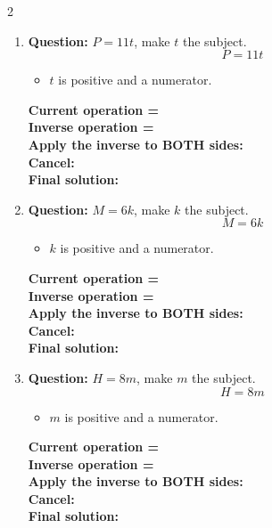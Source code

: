 \documentclass[11pt]{article}
\begin{document}
\begin{multicols}{2}
\begin{enumerate}[leftmargin=*, itemsep=10pt]
\newpage
\item \textbf{Question:} \( P = 11t \), make \( t \) the subject.
\[
P=11t
\]
\begin{itemize}[leftmargin=*, itemsep=2pt]
\item \(t\) is positive and a numerator.
\end{itemize}
\textbf{Current operation =} \\[1cm]
\textbf{Inverse operation =} \\[1cm]
\textbf{Apply the inverse to BOTH sides:} \\[1.5cm]
\textbf{Cancel:} \\[1.5cm]
\textbf{Final solution:}\\[1.5cm]

\item \textbf{Question:} \( M = 6k \), make \( k \) the subject.
\[
M=6k
\]
\begin{itemize}[leftmargin=*, itemsep=2pt]
\item \(k\) is positive and a numerator.
\end{itemize}
\textbf{Current operation =} \\[1cm]
\textbf{Inverse operation =} \\[1cm]
\textbf{Apply the inverse to BOTH sides:} \\[1.5cm]
\textbf{Cancel:} \\[1.5cm]
\textbf{Final solution:}\\[1.5cm]

\columnbreak
\item \textbf{Question:} \( H = 8m \), make \( m \) the subject.
\[
H=8m
\]
\begin{itemize}[leftmargin=*, itemsep=2pt]
\item \(m\) is positive and a numerator.
\end{itemize}
\textbf{Current operation =} \\[1cm]
\textbf{Inverse operation =} \\[1cm]
\textbf{Apply the inverse to BOTH sides:} \\[1.5cm]
\textbf{Cancel:} \\[1.5cm]
\textbf{Final solution:}\\[1.5cm]


\end{enumerate}
\end{multicols}
\end{document}
